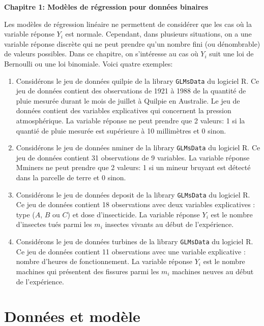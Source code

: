 \documentclass[11pt]{article}
\begin{document}
\begin{center}
{\textbf{\LARGE Chapitre 1: Modèles de régression pour données binaires}}
\end{center}

\tableofcontents
\newpage

\noindent Les modèles de régression linéaire ne permettent de considérer que les cas où la variable réponse $Y_i$ est normale. Cependant, dans plusieurs situations, on a une variable réponse discrète qui ne peut prendre qu'un nombre fini (ou dénombrable) de valeurs possibles. Dans ce chapitre, on s'intéresse au cas où $Y_i$ suit une loi de Bernoulli ou une loi binomiale. Voici quatre exemples:
\begin{enumerate}
\item[{\bf Ex 1:}] Considérons le jeu de données \textsf{quilpie} de la library \texttt{GLMsData} du logiciel \textrm{R}. Ce jeu de données contient des observations de 1921 \`a 1988 de la quantité de pluie mesurée durant le mois de juillet \`a Quilpie en Australie. Le jeu de données contient des variables explicatives qui concernent la pression atmosphérique. La variable réponse ne peut prendre que 2 valeurs: 1 si la quantié de pluie mesurée est supérieure \`a 10 millimètres et 0 sinon.
\item[{\bf Ex 2:}] Considérons le jeu de données \textsf{nminer} de la library \texttt{GLMsData} du logiciel \textrm{R}. Ce jeu de données contient 31 observations de 9 variables. La variable réponse \textsf{Mminers} ne peut prendre que 2 valeurs: 1 si un mineur bruyant est détecté dans la parcelle de terre et 0 sinon.
\item[{\bf Ex 3:}] Considérons le jeu de données \textsf{deposit} de la library \texttt{GLMsData} du logiciel \textrm{R}. Ce jeu de données contient 18 observations avec deux variables explicatives : type ($A$, $B$ ou $C$) et dose d'insecticide. La variable réponse $Y_i$ est le nombre d'insectes tués parmi les $m_i$ insectes vivants au début de l'expérience.
\item[{\bf Ex 4:}] Considérons le jeu de données \textsf{turbines} de la library \texttt{GLMsData} du logiciel \textrm{R}. Ce jeu de données contient 11 observations avec une variable explicative : nombre d'heures de fonctionnement. La variable réponse $Y_i$ est le nombre machines qui présentent des fissures parmi les $m_i$ machines neuves au début de l'expérience.
\end{enumerate}

\section{Données et modèle}
\end{document}
